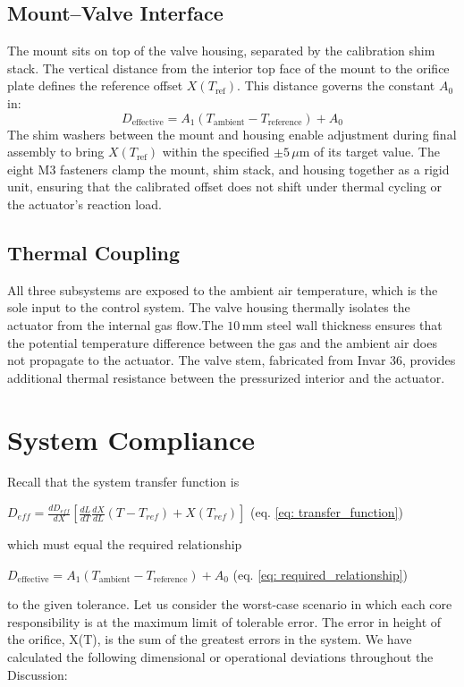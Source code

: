 \documentclass[12pt, letterpaper]{report}%
\newcounter{mycounter}           %
\newcounter{sub}[mycounter]      %
\newcommand{\requiredRelationship}{D_{\text{effective}} = A_1 (T_{\text{ambient}} - T_{\text{reference}}) + A_0}
\newcommand{\transferFunction}{D_{eff}=\frac{dD_{eff}}{dX} \left[\frac{dL}{dT}\frac{dX}{dL}(T-T_{ref})+X\left(T_{ref} \right) \right]}
\begin{document}
    \subsection{Mount–Valve Interface} 
    The mount sits on top of the valve housing, separated by the calibration shim stack. The vertical distance from the interior top face of the mount to the orifice plate defines the reference offset $X(T_{\text{ref}})$. This distance governs the constant $A_0$ in: $$\requiredRelationship$$ The shim washers between the mount and housing enable 
    adjustment during final assembly to bring $X(T_{\text{ref}})$ within the specified $\pm 5\,\mu\text{m}$ of its target value. The eight M3 fasteners clamp the mount, shim stack, and housing together as a rigid unit, ensuring 
    that the calibrated offset does not shift under thermal cycling or the actuator's reaction load.

    \subsection{Thermal Coupling}
    All three subsystems are exposed to the ambient air temperature, which is the sole input to the control system. The valve housing thermally isolates the actuator from the internal gas flow.The $10\,\text{mm}$ steel 
    wall thickness ensures that the potential temperature difference between the gas and the ambient air does not propagate to the actuator. The valve stem, fabricated from Invar 36, provides 
    additional thermal resistance between the pressurized interior and the actuator. 


    \label{subsec:sub_int}

    \section{System Compliance}
    \label{subsec:sys_comp}

        Recall that the system transfer function is 
        
        $\transferFunction$ \quad (eq. \ref{eq: transfer_function})
        
        which must equal the required relationship

        $\requiredRelationship$ \quad (eq. \ref{eq: required_relationship})

        to the given tolerance. Let us consider the worst-case scenario in which each core responsibility is at the maximum limit of tolerable error.
        The error in height of the orifice, X(T), is the sum of the greatest errors in the system. We have calculated the following dimensional or operational deviations throughout the Discussion:
        
\end{document}
